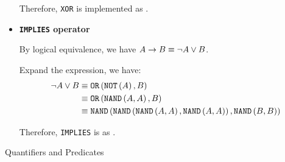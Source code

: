 \documentclass[answers]{exam}
\begin{document}
\begin{questions}
\begin{parts}
\begin{solution}
\begin{itemize}
                Therefore, \texttt{XOR} is implemented as .

                \item \textbf{\texttt{IMPLIES} operator}
                
                By logical equivalence, we have $A \rightarrow B \equiv \neg A \lor B$.

                Expand the expression, we have:
                \begin{align*}
                    \neg A\lor B
                    &\equiv \texttt{OR}\left(\texttt{NOT}\left(A\right), B\right) \\
                    &\equiv \texttt{OR}\left(\texttt{NAND}\left(A, A\right), B\right) \\
                    &\equiv \texttt{NAND}\left(
                        \texttt{NAND}\left(\texttt{NAND}\left(A, A\right), \texttt{NAND}\left(A, A\right)\right)
                    , 
                        \texttt{NAND}\left(B, B\right)
                    \right)
                \end{align*}

                Therefore, \texttt{IMPLIES} is as .
            \end{itemize}
        \end{solution}
    \end{parts}

    \question Quantifiers and Predicates

    \begin{parts}
        

\end{parts}
\end{questions}
\end{document}

